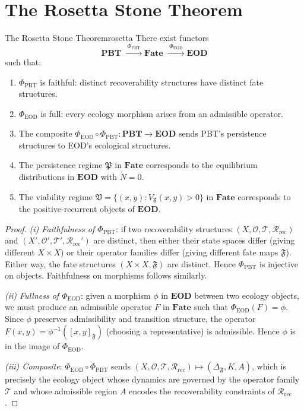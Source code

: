 \documentclass[12pt,twoside,openright]{book}
\newcommand{\transfam}{\mathcal{T}}       %
\newcommand{\recon}{\mathcal{R}_{\mathrm{rec}}}   %
\newcommand{\distPairs}{X\times X}
\newcommand{\fateClasses}{\Delta_{\mathfrak{F}}}
\newcommand{\obs}{\mathcal{O}}
\newcommand{\fateMap}{\mathfrak{F}}
\newcommand{\fateClass}[1]{[#1]_{\mathfrak{F}}}
\newcommand{\admRegion}{A}
\newcommand{\catFate}{\mathbf{Fate}}
\providecommand{\admRegion}{A}
\providecommand{\fateVol}[1]{V_{\fateMap}(#1)}
\providecommand{\fateClasses}{\Delta_{\mathfrak{F}}}
\providecommand{\fateClass}[1]{[#1]_{\mathfrak{F}}}
\providecommand{\catFate}{\mathbf{Fate}}
\providecommand{\transRate}{K}
\providecommand{\catPBT}{\mathbf{PBT}}
\providecommand{\catEOD}{\mathbf{EOD}}
\providecommand{\functorPBT}{\Phi_{\mathrm{PBT}}}
\providecommand{\functorEOD}{\Phi_{\mathrm{EOD}}}
\providecommand{\persRegime}{\mathfrak{P}}
\providecommand{\viabRegime}{\mathfrak{V}}
\begin{document}
\section{The Rosetta Stone Theorem}

\begin{metatheorem}{The Rosetta Stone Theorem}{rosetta}
There exist functors
\[
  \catPBT
  \;\xrightarrow{\;\functorPBT\;}
  \catFate
  \;\xrightarrow{\;\functorEOD\;}
  \catEOD
\]
such that:
\begin{enumerate}[nosep,label=(\roman*)]
  \item $\functorPBT$ is faithful: distinct recoverability
    structures have distinct fate structures.
  \item $\functorEOD$ is full: every ecology morphism arises
    from an admissible operator.
  \item The composite $\functorEOD\circ\functorPBT:
    \catPBT\to\catEOD$ sends PBT's persistence structures
    to EOD's ecological structures.
  \item The persistence regime $\persRegime$ in $\catFate$
    corresponds to the equilibrium distributions in
    $\catEOD$ with $\dot{N}=0$.
  \item The viability regime $\viabRegime=\{(x,y):
    \fateVol{x,y}>0\}$ in $\catFate$ corresponds to the
    positive-recurrent objects of $\catEOD$.
\end{enumerate}
\begin{proof}
\emph{(i) Faithfulness of $\functorPBT$}: if two
recoverability structures $(X,\obs,\transfam,\recon)$ and
$(X',\obs',\transfam',\recon')$ are distinct, then either
their state spaces differ (giving different $\distPairs$)
or their operator families differ (giving different fate
maps $\fateMap$). Either way, the fate structures
$(\distPairs,\fateMap)$ are distinct. Hence $\functorPBT$
is injective on objects. Faithfulness on morphisms follows
similarly.

\emph{(ii) Fullness of $\functorEOD$}: given a morphism
$\phi$ in $\catEOD$ between two ecology objects, we must
produce an admissible operator $F$ in $\catFate$ such that
$\functorEOD(F)=\phi$. Since $\phi$ preserves admissibility
and transition structure, the operator $F(x,y)=
\phi^{-1}(\fateClass{x,y})$ (choosing a representative)
is admissible. Hence $\phi$ is in the image of
$\functorEOD$.

\emph{(iii) Composite}: $\functorEOD\circ\functorPBT$
sends $(X,\obs,\transfam,\recon)\mapsto(\fateClasses,
\transRate,\admRegion)$, which is precisely the ecology
object whose dynamics are governed by the operator family
$\transfam$ and whose admissible region $\admRegion$
encodes the recoverability constraints of $\recon$.


\end{proof}
\end{metatheorem}
\end{document}
